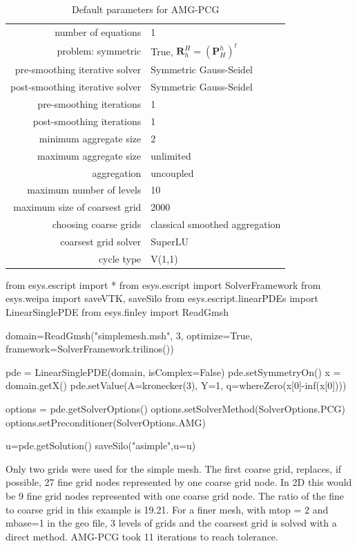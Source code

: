 \begin{table}\center
\begin{tabular}{|r|l|}
\hline
    number of equations & 1\\
    problem: symmetric & True, $\mathbf{R}_h^H = (\mathbf{P}^h_H)^t$ \\
    pre-smoothing iterative solver & Symmetric Gauss-Seidel\\
    post-smoothing iterative solver & Symmetric Gauss-Seidel\\
    pre-smoothing iterations & 1 \\
    post-smoothing iterations & 1 \\
    minimum aggregate size & 2 \\
    maximum aggregate size & unlimited \\
    aggregation & uncoupled \\
    maximum number of levels & 10\\
    maximum size of coarsest grid & 2000\\
    choosing coarse grids & classical smoothed aggregation\\
    coarsest grid solver &  SuperLU\\
    cycle type & V(1,1) \\
    \hline
\end{tabular}\caption{Default parameters for AMG-PCG}\label{defaultAMG}
\end{table}


\begin{python}[caption=basic Trilinos PCG-AMG defaults only script, label=basicAMG ]
from esys.escript import *
from esys.escript import SolverFramework
from esys.weipa import saveVTK, saveSilo
from esys.escript.linearPDEs import LinearSinglePDE
from esys.finley import ReadGmsh

domain=ReadGmsh("simplemesh.msh", 3, optimize=True,
                framework=SolverFramework.trilinos())

pde = LinearSinglePDE(domain, isComplex=False)
pde.setSymmetryOn()
x = domain.getX()
pde.setValue(A=kronecker(3), Y=1, q=whereZero(x[0]-inf(x[0])))

options = pde.getSolverOptions()
options.setSolverMethod(SolverOptions.PCG)
options.setPreconditioner(SolverOptions.AMG)

u=pde.getSolution()
saveSilo("asimple",u=u)
\end{python}

Only two grids were used for the simple mesh.  The first coarse grid, replaces, if possible, 27 fine grid nodes represented by  one coarse grid node.  In 2D this would be 9 fine grid nodes represented with one coarse grid node. The ratio of the fine to coarse grid in this example is 19.21.  For a finer mesh, with mtop = 2 and mbase=1 in the geo file, 3 levels of grids and the coarsest grid is solved with a direct method.  AMG-PCG took 11 iterations to reach tolerance.

